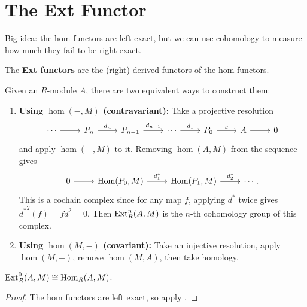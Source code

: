\documentclass[twoside,10pt]{report}
\begin{document}



\section{The Ext Functor}

\begin{note}[]
Big idea: the hom functors are left exact, but we can use cohomology to measure how much they fail to be right exact.
\end{note}

\begin{defn}[]
	The \textbf{Ext functors} are the (right) derived functors of the hom functors.
\end{defn}

Given an $R$-module $A$, there are two equivalent ways to construct them:
\begin{enumerate}
	\item \textbf{Using $\hom(-,M)$ (contravariant):} Take a projective resolution
\[
\begin{tikzcd}
	\cdots \rar & P_{n}\rar{d_{n}} & P_{n-1}\rar{d_{n-1}} & \cdots \rar{d_1} & P_0 \rar{\varepsilon} & A \rar & 0
\end{tikzcd}
\] 
and apply $\hom(-,M)$ to it. Removing $\hom(A,M)$ from the sequence gives
\[
	\begin{tikzcd}
		0 \rar & \hom(P_0,M) \rar{d_1^{*}} & \hom(P_1,M)\rar{d_2^{*}} \rar & \cdots.
	\end{tikzcd}
\] 
This is a cochain complex since for any map $f$, applying $d^{*}$ twice gives ${d^{*}}^2(f) = fd^2=0$. Then $\operatorname{\text{Ext}}_{R}^{n}(A,M)$ is the $n$-th cohomology group of this complex.

	\item \textbf{Using $\hom(M,-)$ (covariant):} Take an injective resolution, apply $\hom(M,-)$, remove $\hom(M,A)$, then take homology.
\end{enumerate}

\begin{prop}
	$\operatorname{\text{Ext}}_{R}^{0}(A,M)\cong \operatorname{Hom}_{R}(A,M)$.
\end{prop}
\begin{proof}
	The hom functors are left exact, so apply .
\end{proof}
\end{document}
